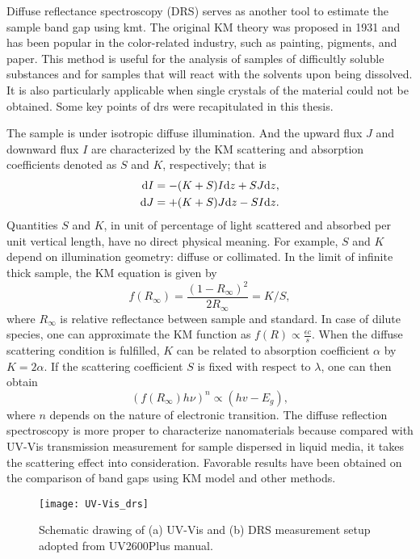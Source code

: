 Diffuse reflectance spectroscopy (DRS) serves as another tool to estimate the sample band gap using \gls{kmt}.\cite{Tandon1970} The original KM theory was proposed in 1931\cite{Kubelka1931} and has been popular in the color-related industry, such as painting, pigments, and paper. This method is useful for the analysis of samples of difficultly soluble substances and for samples that will react with the solvents upon being dissolved. It is also particularly applicable when single crystals of the material could not be obtained. Some key points of \gls{drs} were recapitulated in this thesis.

The sample is under isotropic diffuse illumination. And the upward flux $J$ and downward flux $I$ are characterized by the KM scattering and absorption coefficients denoted as $S$ and $K$, respectively; that is
\begin{align}
\mathrm{d} I &= - (K + S)I \mathrm{d} z + SJ\mathrm{d} z,\\
\mathrm{d} J &= + (K + S)J \mathrm{d} z - SI\mathrm{d} z.
\end{align}
Quantities $S$ and $K$, in unit of percentage of light scattered and absorbed per unit vertical length, have no direct physical meaning. For example, $S$ and $K$ depend on illumination geometry: diffuse or collimated. In the limit of infinite thick sample, the KM equation is given by
\begin{equation}
f(R_\infty) = \frac{(1-R_\infty)^2}{2R_\infty} = K/S,
\end{equation}
where $R_\infty$ is relative reflectance between sample and standard. In case of dilute species, one can approximate the KM function as $f(R) \propto \frac{\epsilon c}{s}$. When the diffuse scattering condition is fulfilled, $K$ can be related to absorption coefficient $\alpha$ by $K = 2\alpha$. If the scattering coefficient $S$ is fixed with respect to $\lambda$, one can then obtain
\begin{equation}
(f(R_\infty) h \nu)^n \propto (hv - E_g),
\end{equation}
where $n$ depends on the nature of electronic transition. The diffuse reflection spectroscopy is more proper to characterize nanomaterials because compared with UV-Vis transmission measurement for sample dispersed in liquid media, it takes the scattering effect into consideration. Favorable results have been obtained on the comparison of band gaps using KM model and other methods.\cite{Tandon1970,Morales2007} 

\begin{figure}[htb]
\centering
\texttt{[image: UV-Vis\_drs]}
\caption[Schematic drawing of UV-Vis and DRS measurement]{Schematic drawing of (a) UV-Vis and (b) DRS measurement setup adopted from UV2600Plus manual.}
\label{fig:ch2uvvis}
\end{figure}

